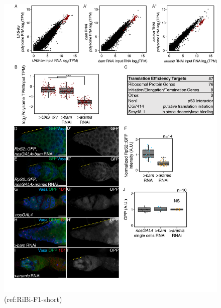 \documentclass[12pt,oneside]{reedthesis}
\begin{document}
\begin{figure}

{\centering \includegraphics[width=6.5 in,height=8.9375 in]{./figure/Ribosome Biogenesis/Ribosome Biogenesis 4} 

}

\caption[(ref:RiBi-F1-short)]{(ref:RiBi-F1-short)}\label{fig:unnamed-chunk-12}
\end{figure}
\end{document}
